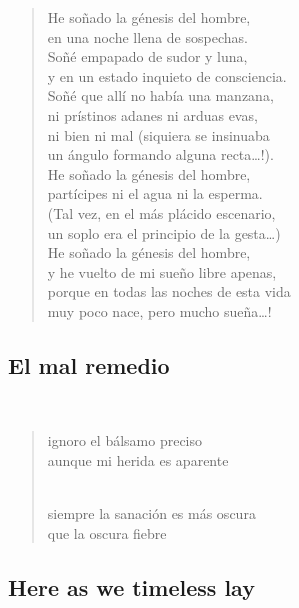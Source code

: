 \documentclass[a4paper, 12pt]{article}
\begin{document}
\begin{verse}

He soñado la génesis del hombre,\\
en una noche llena de sospechas.\\
Soñé empapado de sudor y luna,\\
y en un estado inquieto de consciencia.\\
Soñé que allí no había una manzana,\\
ni prístinos adanes ni arduas evas,\\
ni bien ni mal (siquiera se insinuaba\\
un ángulo formando alguna recta…!).\\
He soñado la génesis del hombre,\\
partícipes ni el agua ni la esperma.\\
(Tal vez, en el más plácido escenario,\\
un soplo era el principio de la gesta…)\\
He soñado la génesis del hombre,\\
y he vuelto de mi sueño libre apenas,\\
porque en todas las noches de esta vida\\
muy poco nace, pero mucho sueña…!\\

\end{verse}

\pagebreak
\subsection{El mal remedio}
~ 

\begin{verse}
    
ignoro el bálsamo preciso\\
aunque mi herida es aparente\\
~ 

siempre la sanación es más oscura\\
que la oscura fiebre\\
\end{verse}

\pagebreak
\subsection{Here as we timeless lay}
~ 
\end{document}
